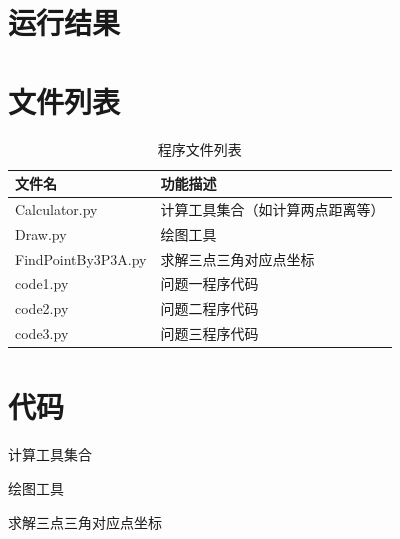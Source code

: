 \documentclass[withoutpreface,bwprint]{cumcmthesis} %
\begin{document}
\begin{appendices}

\section{运行结果}


\section{文件列表}
\begin{table}[H]
    \caption{程序文件列表}
    \centering
    \begin{tabularx}{\textwidth}{l X}
        \bottomrule
        文件名 & 功能描述 \\
        \midrule
        Calculator.py & 计算工具集合（如计算两点距离等） \\
        Draw.py & 绘图工具 \\
        FindPointBy3P3A.py & 求解三点三角对应点坐标 \\
        code1.py & 问题一程序代码 \\
        code2.py & 问题二程序代码 \\
        code3.py & 问题三程序代码 \\
        \bottomrule
    \end{tabularx}
    \label{tab:文件列表}
\end{table}

\section{代码}
计算工具集合

绘图工具

求解三点三角对应点坐标


\end{appendices}
\end{document}
